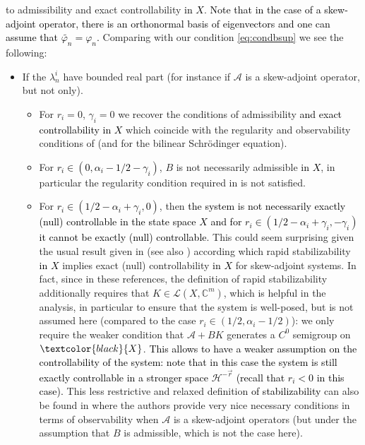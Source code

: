 \documentclass[11pt, dvipsnames]{amsart}
\begin{document}
to admissibility and exact controllability \textcolor{black}{in $X$}. \textcolor{black}{Note that in the case of a skew-adjoint operator, there is an orthonormal basis of eigenvectors and one can assume that $\widetilde{\varphi_{n}} = \varphi_{n}$.}
Comparing with our condition \eqref{eq:condbsup} we see the following:
\begin{itemize}
\item If the $\lambda_{n}^{i}$ have bounded real part (for instance if $\mathcal{A}$ is a skew-adjoint operator, but not only). 
\begin{itemize}
\item For $r_{i}=0$, $\gamma_{i}=0$ we recover the conditions of admissibility \textcolor{black}{and exact controllability in $X$} which coincide with the regularity and observability conditions of \cite{komornik1997rapid,urquiza2005rapid,vest2013rapid,nguyen2024stabilization} (and \cite{Coron2018-rapid,nguyen2024rapid} for the bilinear Schrödinger equation).
\item For \textcolor{black}{$r_{i}\in(0,\alpha_{i}-1/2-\gamma_i)$}, $B$ is not necessarily admissible \textcolor{black}{in $X$}, in particular the regularity condition required in \cite{vest2013rapid,urquiza2005rapid,komornik1997rapid,nguyen2024stabilization} is not satisfied. 
\item For \textcolor{black}{$r_{i}\in(1/2-\alpha_{i}+\gamma_{i},0)$}, then 
\textcolor{black}{the system is not necessarily exactly (null) controllable in the state space $X$ and for $r_{i}\in(1/2-\alpha_{i}+\gamma_{i},-\gamma_{i})$ it cannot be exactly (null) controllable}. This could seem surprising given the usual result  given in \cite[Theorem 16.5]{zabczyk2020mathematical} (see also \cite{trelat2019characterization}) according which rapid stabilizability \textcolor{black}{in $X$} implies exact (null) controllability \textcolor{black}{in $X$} for skew-adjoint systems. In fact, since in these references, the definition of rapid stabilizability additionally requires that $K\in\mathcal{L}(X,\mathbb{C}^{m})$, 
which is helpful in the analysis, in particular to ensure that the system is well-posed, but is not assumed here (compared to the case $r_{i}\in(1/2,\alpha_{i}-1/2)$): we only require the weaker condition that $\mathcal{A}+BK$ generates a $C^{0}$ semigroup on $\textcolor{black}{X}$. \textcolor{black}{This allows to have a weaker assumption on the controllability of the system: note that in this case the system is still exactly controllable in a stronger space $\mathcal{H}^{-\vec{r}}$ (recall that $r_{i}<0$ in this case).} This less restrictive and 
relaxed
definition \textcolor{black}{of stabilizability} can also be found in  \cite{liu2022characterizations,ma2023feedback} where the authors provide very nice necessary conditions in terms of observability when $\mathcal{A}$ is a skew-adjoint operators (but under the assumption that $B$ is admissible, which is not the case here).\\
\end{itemize}



\end{itemize}
\end{document}
